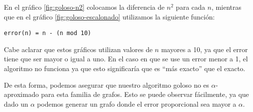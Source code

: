En el gráfico \ref{fig:goloso-n2} colocamos la diferencia de $n^2$ para cada $n$, mientras que en el gráfico \ref{fig:goloso-escalonado} utilizamos la siguiente función:
\begin{verbatim}
error(n) = n - (n mod 10)
\end{verbatim}

Cabe aclarar que estos gráficos utilizan valores de $n$ mayores a 10, ya que el error tiene que ser mayor o igual a uno. En el caso en que se use un error menor a 1, el algoritmo no funciona ya que esto significaría que es ``más exacto'' que el exacto.

De esta forma, podemos asegurar que nuestro algoritmo goloso no es $\alpha$-aproximado para esta familia de grafos. Esto se puede observar fácilmente, ya que dado un $\alpha$ podemos generar un grafo donde el error proporcional sea mayor a $\alpha$.